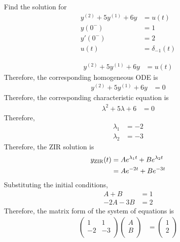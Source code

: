 \documentclass[fleqn, a4paper, 12pt, twoside]{article}
\theoremstyle{definition}
\theoremstyle{theorem}
\begin{document}
\begin{question}
	Find the solution for
	\begin{align*}
		y^{(2)} + 5 y^{(1)} + 6 y & = u(t) \\
		y(0^-)                    & = 1    \\
		y'(0^-)                   & = 2    \\
		u(t)                      & = \delta_{-1}(t)
	\end{align*}
\end{question}

\begin{solution}
	\begin{align*}
		y^{(2)} + 5 y^{(1)} + 6 y & = u(t)
	\end{align*}
	Therefore, the corresponding homogeneous ODE is
	\begin{align*}
		y^{(2)} + 5 y^{(1)} + 6 y & = 0
	\end{align*}
	Therefore, the corresponding characteristic equation is
	\begin{align*}
		\lambda^2 + 5 \lambda + 6 & = 0
	\end{align*}
	Therefore,
	\begin{align*}
		\lambda_1 & = -2 \\
		\lambda_2 & = -3
	\end{align*}
	Therefore, the ZIR solution is
	\begin{align*}
		y_{\textnormal{ZIR}}(t) & = A e^{\lambda_1 t} + B e^{\lambda_2 t} \\
                                        & = A e^{-2 t} + B e^{-3 t}
	\end{align*}
	Substituting the initial conditions,
	\begin{align*}
		A + B      & = 1 \\
		-2 A - 3 B & = 2
	\end{align*}
	Therefore, the matrix form of the system of equations is
	\begin{align*}
			\begin{pmatrix}
				1  & 1  \\
				-2 & -3 \\
			\end{pmatrix}
			\begin{pmatrix}
				A \\
				B \\
			\end{pmatrix}
		&=
			\begin{pmatrix}
				1 \\
				2 \\

\end{pmatrix}
\end{align*}
\end{solution}
\end{document}
